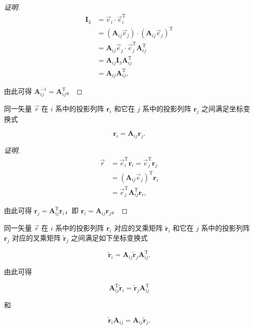 \begin{theorem}
\begin{proof}[证明]
\[
\begin{aligned}
\boldsymbol{I}_3&=\vec{e}_i\cdot\vec{e}_i^{\mathrm{T}}\\
&=(\boldsymbol{A}_{ij}\vec{e}_j)\cdot(\boldsymbol{A}_{ij}\vec{e}_j)^{\mathrm{T}}\\
&=\boldsymbol{A}_{ij}\vec{e}_j\cdot\vec{e}_j^{\mathrm{T}}\boldsymbol{A}_{ij}^{\mathrm{T}}\\
&=\boldsymbol{A}_{ij}\boldsymbol{I}_3\boldsymbol{A}_{ij}^{\mathrm{T}}\\
&=\boldsymbol{A}_{ij}\boldsymbol{A}_{ij}^{\mathrm{T}},
\end{aligned}
\]

由此可得 $\boldsymbol{A}_{ij}^{-1}=\boldsymbol{A}_{ij}^{\mathrm{T}}$。
\end{proof}
\end{theorem}
\begin{theorem}
同一矢量 $\vec{r}$ 在 $i$ 系中的投影列阵 $\boldsymbol{r}_i$ 和它在 $j$ 系中的投影列阵 $\boldsymbol{r}_j$ 之间满足坐标变换式

\[
\boldsymbol{r}_i=\boldsymbol{A}_{ij}\boldsymbol{r}_j.
\]
\begin{proof}[证明]
\[
\begin{aligned}
\vec{r}&=\vec{e}_i^{\mathrm{T}}\boldsymbol{r}_i=\vec{e}_j^{\mathrm{T}}\boldsymbol{r}_j\\
&=(\boldsymbol{A}_{ij}\vec{e}_j)^{\mathrm{T}}\boldsymbol{r}_i\\
&=\vec{e}_j^{\mathrm{T}}\boldsymbol{A}_{ij}^{\mathrm{T}}\boldsymbol{r}_i,
\end{aligned}
\]

由此可得 $\boldsymbol{r}_j=\boldsymbol{A}_{ij}^{\mathrm{T}}\boldsymbol{r}_i$，即 $\boldsymbol{r}_i=\boldsymbol{A}_{ij}\boldsymbol{r}_j$。
\end{proof}
\end{theorem}
\begin{theorem}
同一矢量 $\vec{r}$ 在 $i$ 系中的投影列阵 $\boldsymbol{r}_i$ 对应的叉乘矩阵 $\tilde{\boldsymbol{r}}_i$ 和它在 $j$ 系中的投影列阵 $\boldsymbol{r}_j$ 对应的叉乘矩阵 $\tilde{\boldsymbol{r}}_j$ 之间满足如下坐标变换式

\[
\tilde{\boldsymbol{r}}_i=\boldsymbol{A}_{ij}\tilde{\boldsymbol{r}}_j\boldsymbol{A}_{ij}^{\mathrm{T}}.
\]

由此可得

\[
\boldsymbol{A}_{ij}^{\mathrm{T}}\tilde{\boldsymbol{r}}_i=\tilde{\boldsymbol{r}}_j\boldsymbol{A}_{ij}^{\mathrm{T}}
\]

和

\[
\tilde{\boldsymbol{r}}_i\boldsymbol{A}_{ij}=\boldsymbol{A}_{ij}\tilde{\boldsymbol{r}}_j.
\]
\end{theorem}
